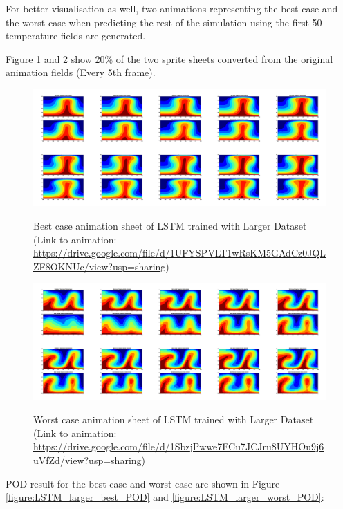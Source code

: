 For better visualisation as well, two animations representing the best case and the worst case when predicting the rest of the simulation using the first 50 temperature fields are generated.

Figure \ref{figure:LSTM_larger_best_gif} and \ref{figure:LSTM_larger_worst_gif} show 20\% of the two sprite sheets converted from the original animation fields (Every 5th frame).

\begin{figure}[H]
    \centering
    \caption{Best case animation sheet of LSTM trained with Larger Dataset (Link to animation: \url{https://drive.google.com/file/d/1UFYSPVLT1wRsKM5GAdCz0JQLZF8OKNUc/view?usp=sharing})}
    \includegraphics[scale=0.10]{figures/mantle_convection_images/larger_dataset/LSTM_Best_GIF_sheet.png}
    \label{figure:LSTM_larger_best_gif}
\end{figure}



\begin{figure}[H]
    \centering
    \caption{Worst case animation sheet of LSTM trained with Larger Dataset (Link to animation: 
    \url{https://drive.google.com/file/d/1SbzjPwwe7FCu7JCJru8UYHOu9j6uVfZd/view?usp=sharing})}
    \includegraphics[scale=0.10]{figures/mantle_convection_images/larger_dataset/LSTM_Worst_GIF_sheet.png}
    \label{figure:LSTM_larger_worst_gif}
\end{figure}

POD result for the best case and worst case are shown in Figure \ref{figure:LSTM_larger_best_POD} and \ref{figure:LSTM_larger_worst_POD}:

